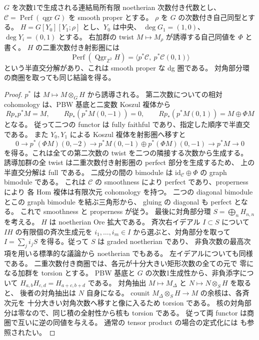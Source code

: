 \begin{lemma}\label{lem:ore-projective-bundle}
$G$ を次数1で生成される連結局所有限 noetherian 次数付き代数とし、
$\mathcal C=\operatorname{Perf}(\operatorname{qgr}G)$ を smooth proper とする。
$\rho$ を $G$ の次数付き自己同型とする。
$H=G[Y_0][Y_1;\rho]$ とし、$Y_0$ は中央、
$\deg G_1=(1,0)$、$\deg Y_i=(0,1)$ とする。
右加群の twist $M\mapsto M_\rho$ が誘導する自己同値を $\Phi$ と書く。
$H$ の二重次数付き射影圏には
\[
 \operatorname{Perf}(\operatorname{Qgr}_{\mathbb Z^2}H)
 =\langle p^*\mathcal C,\ p^*\mathcal C(0,1)\rangle
\]
という半直交分解があり、これは smooth proper な dg 圏である。
対角部分環の商圏を取っても同じ結論を得る。
\end{lemma}
\begin{proof}
$p^*$ は $M\mapsto M\otimes_GH$ から誘導される。
第二次数についての相対 cohomology は、PBW 基底と二変数 Koszul 複体から
\[
 Rp_*p^*M=M,\qquad Rp_*(p^*M(0,-1))=0,\qquad
 Rp_*(p^*M(0,1))=M\oplus\Phi M
\]
となる。
従って二つの functor は fully faithful であり、指定した順序で半直交である。
また $Y_0,Y_1$ による Koszul 複体を射影圏へ移すと
\[
 0\longrightarrow p^*(\Phi M)(0,-2)
 \longrightarrow p^*M(0,-1)\oplus p^*(\Phi M)(0,-1)
 \longrightarrow p^*M\longrightarrow0
\]
を得る。これは全ての第二次数の twist を二つの隣接する次数から生成する。
誘導加群の全 twist は二重次数付き射影圏の perfect 部分を生成するため、
上の半直交分解は full である。
二成分の間の bimodule は $\mathrm{id}_{\mathcal C}\oplus\Phi$ の graph bimodule である。
これは $\mathcal C$ の smoothness により perfect であり、properness により
各 Hom 複体は有限次元 cohomology を持つ。
二つの diagonal bimodule とこの graph bimodule を結ぶ三角形から、
gluing の diagonal も perfect となる。
これで smoothness と properness が従う。
最後に対角部分環 $S=\bigoplus_nH_{n,n}$ を考える。
$H$ は noetherian Ore 拡大である。
斉次右イデアル $I\subset S$ について $IH$ の有限個の斉次生成元を
$i_1,\ldots,i_m\in I$ から選ぶと、対角部分を取って
$I=\sum_j i_jS$ を得る。従って $S$ は graded noetherian であり、
非負次数の最高次項を用いる標準的な議論から noetherian でもある。
左イデアルについても同様である。
二重次数付き商圏では、各元が十分大きい矩形次数の全ての元で
零になる加群を torsion とする。
PBW 基底と $G$ の次数1生成性から、非負添字について
$H_{a,b}H_{c,d}=H_{a+c,b+d}$ である。
対角抽出 $M\mapsto M_\Delta$ と $N\mapsto N\otimes_SH$ を取ると、
後者の対角抽出は $N$ 自身になる。
counit $M_\Delta\otimes_SH\to M$ の余核は、各斉次元を
十分大きい対角次数へ移すと像に入るため torsion である。
核の対角部分は零なので、同じ積の全射性から核も torsion である。
従って両 functor は商圏で互いに逆の同値を与える。
通常の tensor product の場合の定式化には
\cite[\S3.2、定理3.32]{BallardFarman} も参照されたい。
\end{proof}

